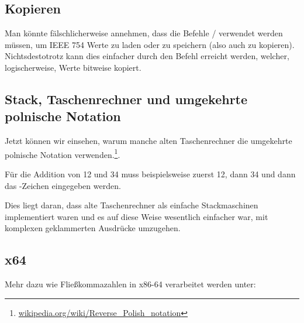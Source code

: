 \subsection{Kopieren}
Man könnte fälschlicherweise annehmen, dass die Befehle /
verwendet werden müssen, um IEEE 754 Werte zu laden oder zu speichern (also
auch zu kopieren). Nichtsdestotrotz kann dies einfacher durch den Befehl
 erreicht werden, welcher, logischerweise, Werte bitweise kopiert.

\subsection{Stack, Taschenrechner und umgekehrte polnische Notation}

Jetzt können wir einsehen, warum manche alten Taschenrechner die umgekehrte
polnische Notation verwenden.\footnote{\href{http://go.yurichev.com/17354}{wikipedia.org/wiki/Reverse\_Polish\_notation}}.

Für die Addition von 12 und 34 muss beispielsweise zuerst 12, dann 34 und dann
das -Zeichen eingegeben werden. 

Dies liegt daran, dass alte Taschenrechner als einfache Stackmaschinen
implementiert waren und es auf diese Weise wesentlich einfacher war, mit
komplexen geklammerten Ausdrücke umzugehen.


\subsection{x64}
Mehr dazu wie Fließkommazahlen in x86-64 verarbeitet werden unter:


